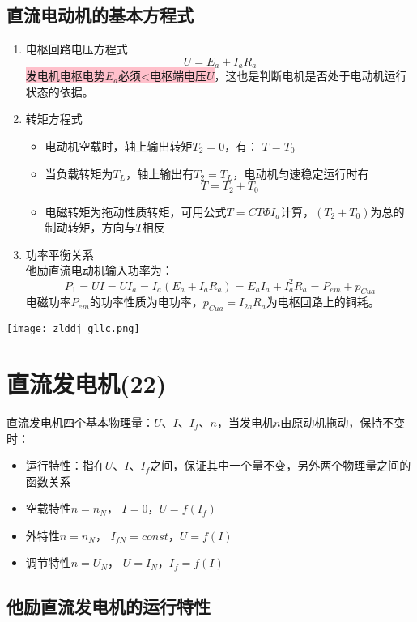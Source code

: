 \documentclass[blue]{elegantnote}
\begin{document}
\section{直流电动机的基本方程式}
\begin{enumerate}
	\item 电枢回路电压方程式            
	$$U = {E_a} + {I_a}{R_a}$$
		\colorbox{pink}{发电机电枢电势$E_{a}$必须<电枢端电压$U$}，这也是判断电机是否处于电动机运行状态的依据。 
	\item 转矩方程式 
	\begin{itemize}
		\item 电动机空载时，轴上输出转矩$T_{2}=0$，有： $T=T_{0}$
		\item 当负载转矩为$T_{L}$，轴上输出有$T_{2}=T_{L}$，电动机匀速稳定运行时有 
		$$T = {T_2} + {T_0}$$
		\item 电磁转矩为拖动性质转矩，可用公式$T=CT\Phi I_{a}$计算，$(T_{2}+T_{0})$为总的制动转矩，方向与$T$相反
	\end{itemize}
	\item 功率平衡关系 \\
	他励直流电动机输入功率为：
	$${P_1} = UI = U{I_a} = {I_a}\left( {{E_a} + {I_a}{R_a}} \right) = {E_a}{I_a} + I_a^2{R_a}={P_{em}} + {p_{Cua}}$$
	电磁功率$P_{em}$的功率性质为电功率，$p_{Cua}=I_{2a}R_{a}$为电枢回路上的铜耗。
\end{enumerate}
	\begin{center}
		\texttt{[image: zlddj\_gllc.png]}
	\end{center}

\chapter{直流发电机(22)}
直流发电机四个基本物理量：$U$、$I$、$I_{f}$、$n$，当发电机$n$由原动机拖动，保持不变时：
\begin{itemize}
	\item 运行特性：指在$U$、$I$、$I_{f}$之间，保证其中一个量不变，另外两个物理量之间的函数关系
	\item 空载特性$n=n_{N}$， $I=0$，$U=f(I_f)$
	\item 外特性$n=n_{N}$， $I_{fN}=const$，$U=f(I)$
	\item 调节特性$n=U_N$， $U=I_N$，$I_{f}=f(I)$ 	
\end{itemize}
\section{他励直流发电机的运行特性}
\end{document}
